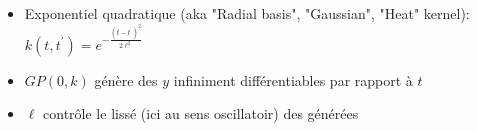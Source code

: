 \documentclass[xcolor=svgnames, t]{beamer}
\begin{document}
\begin{frame}{\subsecname}
  \begin{itemize}
    \item<1-> Exponentiel quadratique (aka "Radial basis", "Gaussian", "Heat" kernel):
    $k (t, t^\prime) = e^{- \frac{(t - t^\prime)^2}{2 \ell^2} }$
    \item<1-> $GP (0, k)$ génère des $y$ infiniment différentiables par rapport à $t$
    \item<1-> $\ell$ contrôle le lissé (ici au sens oscillatoir) des générées
  \end{itemize}
  \begin{figure}
  \end{figure}
\end{frame}
\end{document}
